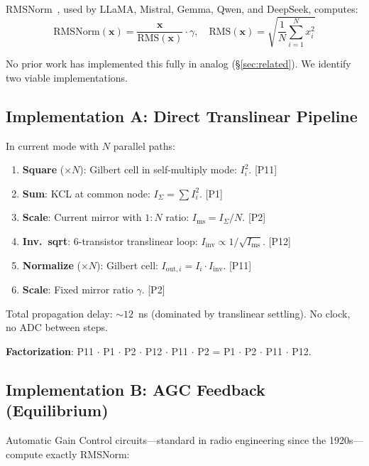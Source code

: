 \documentclass[11pt]{article}
\begin{document}
RMSNorm~\cite{zhang_rmsnorm2019}, used by LLaMA, Mistral, Gemma, Qwen, and DeepSeek, computes:
\begin{equation}
\text{RMSNorm}(\mathbf{x}) = \frac{\mathbf{x}}{\text{RMS}(\mathbf{x})} \cdot \gamma, \quad \text{RMS}(\mathbf{x}) = \sqrt{\frac{1}{N}\sum_{i=1}^{N} x_i^2}
\end{equation}

No prior work has implemented this fully in analog (\S\ref{sec:related}). We identify two viable implementations.

\subsection{Implementation A: Direct Translinear Pipeline}

In current mode with $N$ parallel paths:

\begin{enumerate}[leftmargin=*]
\item \textbf{Square} ($\times N$): Gilbert cell in self-multiply mode: $I_i^2$. \hfill [P11]
\item \textbf{Sum}: KCL at common node: $I_{\Sigma} = \sum I_i^2$. \hfill [P1]
\item \textbf{Scale}: Current mirror with $1{:}N$ ratio: $I_{\text{ms}} = I_{\Sigma}/N$. \hfill [P2]
\item \textbf{Inv.\ sqrt}: 6-transistor translinear loop: $I_{\text{inv}} \propto 1/\sqrt{I_{\text{ms}}}$. \hfill [P12]
\item \textbf{Normalize} ($\times N$): Gilbert cell: $I_{\text{out},i} = I_i \cdot I_{\text{inv}}$. \hfill [P11]
\item \textbf{Scale}: Fixed mirror ratio $\gamma$. \hfill [P2]
\end{enumerate}

Total propagation delay: ${\sim}12$~ns (dominated by translinear settling). No clock, no ADC between steps.

\textbf{Factorization}: P11 $\cdot$ P1 $\cdot$ P2 $\cdot$ P12 $\cdot$ P11 $\cdot$ P2 = P1 $\cdot$ P2 $\cdot$ P11 $\cdot$ P12.

\subsection{Implementation B: AGC Feedback (Equilibrium)}

Automatic Gain Control circuits---standard in radio engineering since the 1920s---compute exactly RMSNorm:
\end{document}

